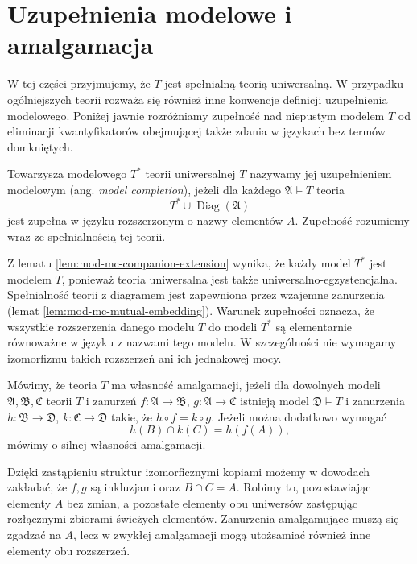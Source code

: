 \section{Uzupełnienia modelowe i amalgamacja}
W tej części przyjmujemy, że $T$ jest spełnialną teorią
uniwersalną. W przypadku ogólniejszych teorii rozważa
się również inne konwencje definicji uzupełnienia
modelowego. Poniżej jawnie rozróżniamy zupełność nad
niepustym modelem $T$ od eliminacji kwantyfikatorów
obejmującej także zdania w językach bez termów domkniętych.

\begin{definicja}
\label{def:mod-mc-completion}
Towarzysza modelowego $T^*$ teorii uniwersalnej $T$
nazywamy jej uzupełnieniem modelowym
(ang. \emph{model completion}), jeżeli dla każdego
$\mathfrak A\models T$ teoria
\[
T^*\cup\operatorname{Diag}(\mathfrak A)
\]
jest zupełna w języku rozszerzonym o nazwy elementów $A$.
Zupełność rozumiemy wraz ze spełnialnością tej teorii.
\end{definicja}

Z lematu \ref{lem:mod-mc-companion-extension}
wynika, że każdy model $T^*$ jest modelem $T$,
ponieważ teoria uniwersalna jest także
uniwersalno-egzystencjalna.
Spełnialność teorii z diagramem jest zapewniona
przez wzajemne zanurzenia
(lemat \ref{lem:mod-mc-mutual-embedding}).
Warunek zupełności oznacza, że wszystkie rozszerzenia
danego modelu $T$ do modeli $T^*$ są elementarnie
równoważne w języku z nazwami tego modelu.
W szczególności nie wymagamy izomorfizmu takich
rozszerzeń ani ich jednakowej mocy.

\begin{definicja}
\label{def:mod-mc-amalgamation}
Mówimy, że teoria $T$ ma własność amalgamacji, jeżeli
dla dowolnych modeli $\mathfrak A,\mathfrak B,\mathfrak C$
teorii $T$ i zanurzeń
$f:\mathfrak A\to\mathfrak B$, $g:\mathfrak A\to\mathfrak C$
istnieją model $\mathfrak D\models T$ i zanurzenia
$h:\mathfrak B\to\mathfrak D$, $k:\mathfrak C\to\mathfrak D$
takie, że $h\circ f=k\circ g$.
Jeżeli można dodatkowo wymagać
\[
h(B)\cap k(C)=h(f(A)),
\]
mówimy o silnej własności amalgamacji.
\end{definicja}

Dzięki zastąpieniu struktur izomorficznymi kopiami
możemy w dowodach zakładać, że $f,g$ są inkluzjami
oraz $B\cap C=A$. Robimy to, pozostawiając elementy
$A$ bez zmian, a pozostałe elementy obu uniwersów
zastępując rozłącznymi zbiorami świeżych elementów.
Zanurzenia amalgamujące muszą się zgadzać na $A$,
lecz w zwykłej amalgamacji mogą utożsamiać również
inne elementy obu rozszerzeń.

